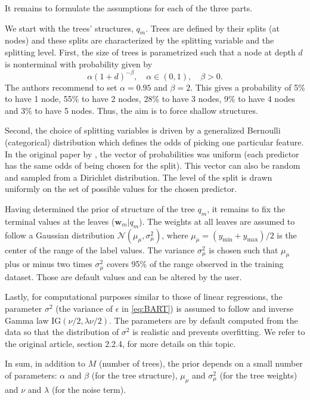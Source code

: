 \documentclass[]{krantz}
\theoremstyle{definition}
\theoremstyle{definition}
\theoremstyle{definition}
\theoremstyle{remark}
\begin{document}
It remains to formulate the assumptions for each of the three parts.

We start with the trees' structures, \(q_m\). Trees are defined by their
splits (at nodes) and these splits are characterized by the splitting
variable and the splitting level. First, the size of trees is
parametrized such that a node at depth \(d\) is nonterminal with
probability given by \begin{equation}
\label{eq:bartnode}
\alpha(1+d)^{-\beta}, \quad \alpha \in (0,1), \quad \beta >0.
\end{equation} The authors recommend to set \(\alpha = 0.95\) and
\(\beta=2\). This gives a probability of 5\% to have 1 node, 55\% to
have 2 nodes, 28\% to have 3 nodes, 9\% to have 4 nodes and 3\% to have
5 nodes. Thus, the aim is to force shallow structures.

Second, the choice of splitting variables is driven by a generalized
Bernoulli (categorical) distribution which defines the odds of picking
one particular feature. In the original paper by
\citet{chipman2010bart}, the vector of probabilities was uniform (each
predictor has the same odds of being chosen for the split). This vector
can also be random and sampled from a Dirichlet distribution. The level
of the split is drawn uniformly on the set of possible values for the
chosen predictor.

Having determined the prior of structure of the tree \(q_m\), it remains
to fix the terminal values at the leaves (\(\textbf{w}_m|q_m\)). The
weights at all leaves are assumed to follow a Gaussian distribution
\(\mathcal{N}(\mu_\mu,\sigma_\mu^2)\), where
\(\mu_\mu=(y_\text{min}+y_\text{max})/2\) is the center of the range of
the label values. The variance \(\sigma_\mu^2\) is chosen such that
\(\mu_\mu\) plus or minus two times \(\sigma_\mu^2\) covers 95\% of the
range observed in the training dataset. Those are default values and can
be altered by the user.

Lastly, for computational purposes similar to those of linear
regressions, the parameter \(\sigma^2\) (the variance of \(\epsilon\) in
\eqref{eq:BART}) is assumed to follow and inverse Gamma law
\(\text{IG}(\nu/2,\lambda \nu/2)\). The parameters are by default
computed from the data so that the distribution of \(\sigma^2\) is
realistic and prevents overfitting. We refer to the original article,
section 2.2.4, for more details on this topic.

In sum, in addition to \(M\) (number of trees), the prior depends on a
small number of parameters: \(\alpha\) and \(\beta\) (for the tree
structure), \(\mu_\mu\) and \(\sigma_\mu^2\) (for the tree weights) and
\(\nu\) and \(\lambda\) (for the noise term).
\end{document}
